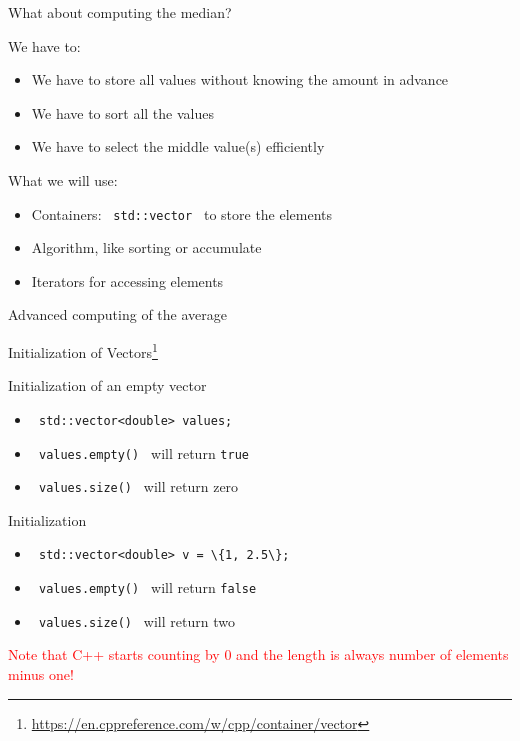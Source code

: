 \documentclass[\classoption]{beamer}
\begin{document}
\begin{frame}{What about computing the median?}

\begin{block}{We have to:}
\begin{itemize}
\item We have to store all values without knowing the amount in advance
\item We have to sort all the values 
\item We have to select the middle value(s) efficiently
\end{itemize}

\end{block}
\pause
\begin{block}{What we will use:}
\begin{itemize}
\item Containers: \lstinline| std::vector | to store the elements
\item Algorithm, like sorting or accumulate
\item Iterators for accessing elements
\end{itemize}

\end{block}

\end{frame}

\begin{frame}{Advanced computing of the average}



\end{frame}

\begin{frame}{Initialization of Vectors\footnote{\tiny{\url{https://en.cppreference.com/w/cpp/container/vector}}}}

\begin{block}{Initialization of an empty vector}
\begin{itemize}
\item \lstinline| std::vector<double> values;| 
\item \lstinline| values.empty() | will return \lstinline|true|
\item \lstinline| values.size() | will return zero
\end{itemize}
\end{block}

\begin{block}{Initialization}
\begin{itemize}
\item \lstinline| std::vector<double> v = \{1, 2.5\}; |
\item \lstinline| values.empty() | will return \lstinline|false|
\item \lstinline| values.size() | will return two
\end{itemize}
\end{block}

\textcolor{red}{Note that C++ starts counting by 0 and the length is always number of elements minus one!}

\end{frame}
\end{document}

